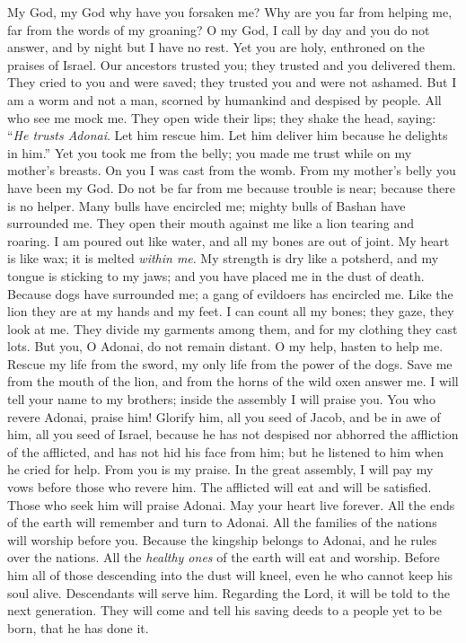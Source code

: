 \begin{biblechapter} %
 My God, my God why have you forsaken me? 
Why are you far from helping me, far from the words of my groaning?
\verse O my God, I call by day and you do not answer, 
and by night but I have no rest.
\verse Yet you are holy, 
enthroned on the praises of Israel.
\verse Our ancestors trusted you; 
they trusted and you delivered them.
\verse They cried to you and were saved; 
they trusted you and were not ashamed.
\verse But I am a worm and not a man, 
scorned by humankind and despised by people.
\verse All who see me mock me. 
They open wide their lips; 
they shake the head, saying:
\verse “\textit{He trusts Adonai}. Let him rescue him. 
Let him deliver him because he delights in him.”
\verse Yet you took me from the belly; 
you made me trust while on my mother’s breasts.
\verse On you I was cast from the womb. 
From my mother’s belly you have been my God.
\verse Do not be far from me 
because trouble is near; 
because there is no helper.
\verse Many bulls have encircled me; 
mighty bulls of Bashan have surrounded me.
\verse They open their mouth against me 
like a lion tearing and roaring.
\verse I am poured out like water, 
and all my bones are out of joint. 
My heart is like wax; 
it is melted \textit{within me}.
\verse My strength is dry like a potsherd, 
and my tongue is sticking to my jaws; 
and you have placed me in the dust of death.
\verse Because dogs have surrounded me; 
a gang of evildoers has encircled me. 
Like the lion they are at my hands and my feet.
\verse I can count all my bones; 
they gaze, they look at me.
\verse They divide my garments among them, 
and for my clothing they cast lots.
\verse But you, O Adonai, do not remain distant. 
O my help, hasten to help me.
\verse Rescue my life from the sword, 
my only life from the power of the dogs.
\verse Save me from the mouth of the lion, 
and from the horns of the wild oxen answer me.
\verse I will tell your name to my brothers; 
inside the assembly I will praise you.
\verse You who revere Adonai, praise him! 
Glorify him, all you seed of Jacob, 
and be in awe of him, all you seed of Israel,
\verse because he has not despised nor abhorred the affliction of the afflicted, 
and has not hid his face from him; 
but he listened to him when he cried for help.
\verse From you is my praise. 
In the great assembly, 
I will pay my vows before those who revere him.
\verse The afflicted will eat and will be satisfied. 
Those who seek him will praise Adonai. 
May your heart live forever.
\verse All the ends of the earth 
will remember and turn to Adonai. 
All the families of the nations 
will worship before you.
\verse Because the kingship belongs to Adonai, 
and he rules over the nations.
\verse All the \textit{healthy ones} of the earth will eat and worship. 
Before him all of those descending into the dust will kneel, 
even he who cannot keep his soul alive.
\verse Descendants will serve him. 
Regarding the Lord, it will be told to the next generation.
\verse They will come and tell his saving deeds 
to a people yet to be born, that he has done it.
\end{biblechapter}

